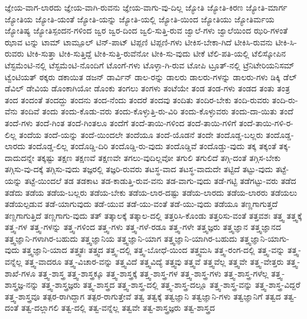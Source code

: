 {ಜ್ಞೇಯ-ವಾಗ-ಲಾರದು
ಜ್ಞೇಯ-ವಾಗಿ-ರುವನು
ಜ್ಞೇಯ-ವಾಗು-ವು-ದಿಲ್ಲ
ಜ್ಯೋತಿ
ಜ್ಯೋತಿ-ಕಿರಣ
ಜ್ಯೋತಿ-ಮಾರ್ಗ
ಜ್ಯೋತಿಯ
ಜ್ಯೋತಿ-ಯಂತೆ
ಜ್ಯೋತಿ-ಯನ್ನು
ಜ್ಯೋತಿ-ಯಲ್ಲಿ
ಜ್ಯೋತಿ-ಯಿಂದ
ಜ್ಯೋತಿಯು
ಜ್ಯೋತಿರ್ಮಯ
ಜ್ಯೋತಿಷ್ಯ
ಜ್ಯೋತಿಸ್ಪಂದನ-ಗಳಿಂದ
ಜ್ವರ
ಜ್ವರ-ದಿಂದ
ಜ್ವಲಿ-ಸುತ್ತಿ-ರುವ
ಜ್ವಾಲೆ-ಗಳು
ಜ್ವಾಲೆಯಿಂದ
ಝರಿ-ಗಳಂತೆ
ಝಾವ
ಟನ್ನು
ಟಾಮ್
ಟಾಮ್ಪೂಲ್
ಟಿನ್-ಪಾಟ್
ಟಿಪ್ಪಣಿ
ಟಿಪ್ಪಣಿ-ಗಳು
ಟೀಕಿಸ-ಬೇಕಾ-ಗಿದೆ
ಟೀಕಿಸಿ-ರುವನು
ಟೀಕಿ-ಸಿ-ರುವರು
ಟೀಕಿ-ಸುತ್ತಾ
ಟೀಕಿ-ಸುತ್ತಿದ್ದೆ
ಟೀಕಿ-ಸುತ್ತಿ-ರುವೆನೋ
ಟೀಕಿ-ಸು-ವುದು
ಟೀಕೆ
ಟೆಲಿ-ಪತಿ-ಯಲ್ಲಿ
ಟೆಲಿಸ್ಕೋಪಿನ
ಟೆಸ್ಟಮೆಂಟಿ-ನಲ್ಲಿ
ಟೆಸ್ಟಮೆಂಟಿ-ನೊಂದಿಗೆ
ಟೊಂಗೆ-ಗಳು
ಟೊಳ್ಳಾ-ಗಿ-ರುವ
ಟೋಪಿ
ಟ್ರೂತ್-ನಲ್ಲಿ
ಟ್ರೆನಿಟೇರಿಯನಿಸಮ್
ಟ್ವೆಂಟಿಯತ್
ಠಕ್ಕರು
ಡಕಾಯಿತ
ಡಜನ್
ಡಾರ್ವಿನ್
ಡಾಲ-ರನ್ನು
ಡಾಲರು
ಡಾಲರು-ಗಳನ್ನು
ಡಾಲರು-ಗಳು
ಡಿಕ್ಕಿ
ಡೆಲ್
ಡೆವಿಲ್
ಡೇವಿಯ
ಡೊಂಕಾಗಿಯೋ
ಡೊಂಕು
ತಂಗಲು
ತಂಗಳು
ತಂಟೆಯೇ
ತಂಡ
ತಂಡ-ಗಳು
ತಂಡದ
ತಂತು
ತಂತ್ರ
ತಂದ
ತಂದಂತೆ
ತಂದದ್ದು
ತಂದನು
ತಂದ-ನೆಂದು
ತಂದರೆ
ತಂದವು
ತಂದಿತು
ತಂದಿರ-ಬೇಕು
ತಂದಿ-ರುವರು
ತಂದಿ-ರು-ವೆನು
ತಂದಿವೆ
ತಂದು
ತಂದು-ಕೊಡು-ವರು
ತಂದು-ಕೊಳ್ಳುತ್ತಿ-ರು-ವಿರಿ
ತಂದು-ಕೊಳ್ಳುವರು
ತಂದು-ದಾ-ಯಿತು
ತಂದೆ
ತಂದೆ-ಗಳು
ತಂದೆ-ಗಿಂತ
ತಂದೆ-ಗಿಂತಲೂ
ತಂದೆಗೆ
ತಂದೆ-ತಾಯಿ-ಗಳಿಂದ
ತಂದೆ-ತಾಯಿ-ಗಳಿಗೆ
ತಂದೆ-ತಾಯಿ-ಗಳಿ-ರ-ಲಿಲ್ಲ
ತಂದೆಯ
ತಂದೆ-ಯನ್ನು
ತಂದೆ-ಯಿಂದಲೇ
ತಂದೆಯೂ
ತಂದೆ-ಯೊಡನೆ
ತಂದೇ
ತಂದೊಡ್ಡ-ಬಲ್ಲರು
ತಂದೊಡ್ಡ-ಲಾರದು
ತಂದೊಡ್ಡ-ಲಿಲ್ಲ
ತಂದೊಡ್ಡಿ-ದಿರಿ
ತಂದೊಡ್ಡಿ-ರು-ವುದು
ತಂದೊಡ್ಡಿವೆ
ತಂದೊಡ್ಡು-ವುದು
ತಕ್ಕ
ತಕ್ಕಂತೆ
ತಕ್ಕ-ದಾದುದನ್ನೇ
ತಕ್ಕಷ್ಟು
ತಕ್ಷಣ
ತಕ್ಷಣವೆ
ತಕ್ಷಣವೇ
ತಗಲು-ವುದಿಲ್ಲವೋ
ತಗುಲಿ
ತಗುಲಿದೆ
ತಗ್ಗಿ-ದಂತೆ
ತಗ್ಗಿಸ-ಬೇಕು
ತಗ್ಗಿಸು-ವು-ದಕ್ಕೆ
ತಗ್ಗಿಸು-ವುದು
ತಜ್ಞರಲ್ಲಿ
ತಜ್ಞರಿ-ರುವರು
ತಟಸ್ಥ-ವಾದ
ತಟಸ್ಥ-ವಾದುದೇ
ತಟ್ಟಿದೆ
ತಟ್ಟು-ವುದು
ತಟ್ಟೆ-ಯನ್ನು
ತಟ್ಟೆ-ಯಿಂದಲೆ
ತಡ
ತಡಕಾಟ
ತಡ-ಕಾಡುತ್ತಿ-ರುವ-ವನು
ತಡ-ವಾಗು-ವುದು
ತಡೆ-ಗಟ್ಟಿ
ತಡೆಗಟ್ಟು-ವರು
ತಡೆದ
ತಡೆದು
ತಡೆಯ
ತಡೆಯ-ಬಲ್ಲರು
ತಡೆಯ-ಬೇಕು
ತಡೆಯ-ಲಾರ-ದಷ್ಟು
ತಡೆಯ-ಲಾರದು
ತಡೆಯ-ಲಾರರು
ತಡೆಯಲು
ತಡೆಯಲ್ಪಡುವ
ತಡೆ-ಯಾಗುವುದು
ತಡೆ-ಯುವ
ತಡೆ-ಯು-ವಂತೆ
ತಡೆ-ಯು-ವುದು
ತಡೆಯೂ
ತಣ್ಣಗಾಗುತ್ತದೆ
ತಣ್ಣಗಾಗುತ್ತಿದೆ
ತಣ್ಣಗಾಗು-ವುದು
ತತ್
ತತ್ಕಾಲಕ್ಕೆ
ತತ್ಕಾಲ-ದಲ್ಲಿ
ತತ್ತರಿಸಿ-ಕೊಂಡು
ತತ್ತರಿಸು-ವಂತೆ
ತತ್ತವಶಃ
ತತ್ತ್ವ
ತತ್ತ್ವಕ್ಕೆ
ತತ್ತ್ವ-ಗಳ
ತತ್ತ್ವ-ಗಳನ್ನು
ತತ್ತ್ವ-ಗಳಿಂದ
ತತ್ತ್ವ-ಗಳು
ತತ್ತ್ವ-ಗಳೆ-ರಡೂ
ತತ್ತ್ವ-ಗಳೇ
ತತ್ತ್ವಜ್ಞರು
ತತ್ತ್ವಜ್ಞಾನ
ತತ್ತ್ವಜ್ಞಾನದ
ತತ್ತ್ವಜ್ಞಾನಿ-ಗಳಾಗಿರ-ಬಹುದು
ತತ್ತ್ವಜ್ಞಾನಿಯ
ತತ್ತ್ವಜ್ಞಾನಿ-ಯಾಗ
ತತ್ತ್ವಜ್ಞಾನಿ-ಯಾಗಿರ-ಬಹುದು
ತತ್ತ್ವಜ್ಞಾನಿ-ಯಾಗು-ವುದು
ತತ್ತ್ವಜ್ಞಾನಿ-ಯಾದ
ತತ್ತ್ವತಃ
ತತ್ತ್ವದ
ತತ್ತ್ವ-ದಲ್ಲಿ
ತತ್ತ್ವ-ಬೋಧೆ-ಯಿಂದ
ತತ್ತ್ವಮಸಿ
ತತ್ತ್ವ-ರಂಗ-ದಲ್ಲಿ
ತತ್ತ್ವ-ವನ್ನು
ತತ್ತ್ವ-ವನ್ನೆಲ್ಲ
ತತ್ತ್ವ-ವಾದರೂ
ತತ್ತ್ವ-ವಿಚಾರ-ವನ್ನು
ತತ್ತ್ವವಿದೆ
ತತ್ತ್ವವಿದ್ಯೆ
ತತ್ತ್ವವು
ತತ್ತ್ವವೆ
ತತ್ತ್ವವೆಲ್ಲ
ತತ್ತ್ವವೇ
ತತ್ತ್ವ-ವೇತ್ತರು
ತತ್ತ್ವ-ಶಾಖೆ-ಗಳೂ
ತತ್ತ್ವ-ಶಾಸ್ತ್ರ
ತತ್ತ್ವ-ಶಾಸ್ತ್ರಕ್ಕೂ
ತತ್ತ್ವ-ಶಾಸ್ತ್ರಕ್ಕೆ
ತತ್ತ್ವ-ಶಾಸ್ತ್ರ-ಗಳ
ತತ್ತ್ವ-ಶಾಸ್ತ್ರ-ಗಳು
ತತ್ತ್ವ-ಶಾಸ್ತ್ರ-ಗಳೆಲ್ಲ
ತತ್ತ್ವ-ಶಾಸ್ತ್ರಜ್ಞ-ನನ್ನು
ತತ್ತ್ವ-ಶಾಸ್ತ್ರಜ್ಞರು
ತತ್ತ್ವ-ಶಾಸ್ತ್ರದ
ತತ್ತ್ವ-ಶಾಸ್ತ್ರ-ದಲ್ಲಿ
ತತ್ತ್ವ-ಶಾಸ್ತ್ರ-ದಲ್ಲೂ
ತತ್ತ್ವ-ಶಾಸ್ತ್ರ-ವನ್ನು
ತತ್ತ್ವ-ಶಾಸ್ತ್ರ-ವಿದ್ದರೆ
ತತ್ತ್ವ-ಶಾಸ್ತ್ರವೂ
ತತ್ಪರ-ರಾಗಿದ್ದಾಗ
ತತ್ಪರ-ರಾಗುತ್ತೇವೆ
ತತ್ವ
ತತ್ವಕ್ಕೆ
ತತ್ವಜ್ಞಾನಿ
ತತ್ವಜ್ಞಾನಿ-ಗಳು
ತತ್ವಜ್ಞಾನಿಗೆ
ತತ್ವದ
ತತ್ವ-ದಂತೆ
ತತ್ವ-ದಲ್ಲಾಗಲಿ
ತತ್ವ-ದಲ್ಲಿ
ತತ್ವ-ವನ್ನೆಲ್ಲ
ತತ್ವವೇ
ತತ್ವ-ಶಾಸ್ತ್ರಜ್ಞರು
ತತ್ವ-ಶಾಸ್ತ್ರದ
}
